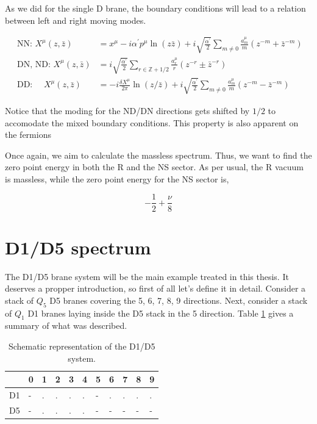 As we did for the single D brane, the boundary conditions will lead to a relation between left and right moving modes. 

\begin{align}
    \text { NN: } X^\mu(z, \bar{z}) & =x^\mu-i \alpha^{\prime} p^\mu \ln (z \bar{z})+i \sqrt{\frac{\alpha^{\prime}}{2}} \sum_{m \neq 0} \frac{a_m^\mu}{m}\left(z^{-m}+\bar{z}^{-m}\right) \\
    \text { DN, ND: } X^\mu(z, \bar{z}) & =i \sqrt{\frac{\alpha^{\prime}}{2}} \sum_{r \in \mathbb{Z}+1 / 2} \frac{a_r^\mu}{r}\left(z^{-r} \pm \bar{z}^{-r}\right) \\
    \text { DD: } \quad X^\mu(z, \bar{z}) & =-i \frac{\delta X^\mu}{2 \pi} \ln (z / \bar{z})+i \sqrt{\frac{\alpha^{\prime}}{2}} \sum_{m \neq 0} \frac{a_m^\mu}{m}\left(z^{-m}-\bar{z}^{-m}\right)
\end{align}

Notice that the moding for the ND/DN directions gets shifted by $1/2$ to accomodate the mixed boundary conditions. This property is also apparent on the fermions 

Once again, we aim to calculate the massless spectrum. Thus, we want to find the zero point energy in both the R and the NS sector. As per usual, the R vacuum is massless, while the zero point energy for the NS sector is,

\begin{equation}
    \label{eq:zero-point-mixed}
    -\frac{1}{2} + \frac{\nu}{8}
\end{equation}

\section{D1/D5 spectrum}

The D1/D5 brane system will be the main example treated in this thesis. It deserves a propper introduction, so first of all let's define it in detail. Consider a stack of $Q_5$ D5 branes covering the 5, 6, 7, 8, 9 directions. Next, consider a stack of $Q_1$ D1 branes laying inside the D5 stack in the 5 direction. Table \ref{table:D1/D5} gives a summary of what was described.

\begin{table}[h]
    \centering
    \begin{tabular}{|l|l|l|l|l|l|l|l|l|l|l|}
    \hline
       & 0 & 1 & 2 & 3 & 4 & 5 & 6 & 7 & 8 & 9 \\ \hline
    D1 & - & . & . & . & . & - & . & . & . & . \\ \hline
    D5 & - & . & . & . & . & - & - & - & - & - \\ \hline
\end{tabular}
\caption{Schematic representation of the D1/D5 system.}
\label{table:D1/D5}
\end{table}

